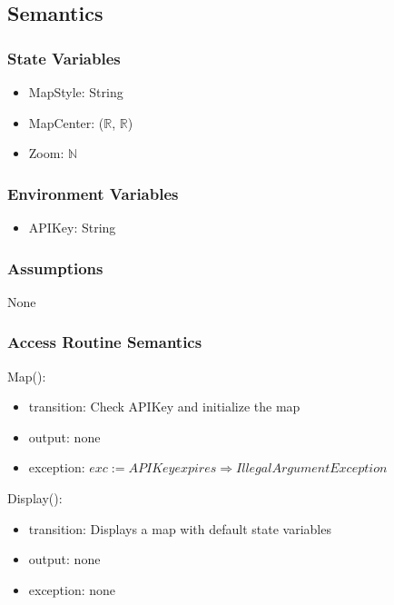 \documentclass[12pt, titlepage]{article}
\begin{document}
\subsection{Semantics}

\subsubsection{State Variables}

\begin{itemize}
\item MapStyle: String
\item MapCenter: ($\mathbb{R}$, $\mathbb{R}$)
\item Zoom: $\mathbb{N}$
\end{itemize}

\subsubsection{Environment Variables}

\begin{itemize}
\item APIKey: String
\end{itemize}

\subsubsection{Assumptions}

None

\subsubsection{Access Routine Semantics}

\noindent Map():
\begin{itemize}
\item transition: Check APIKey and initialize the map
\item output: none
\item exception: $exc := APIKey expires \Rightarrow IllegalArgument Exception$
\end{itemize}

\noindent Display():
\begin{itemize}
\item transition: Displays a map with default state variables
\item output: none
\item exception: none
\end{itemize}
\end{document}
